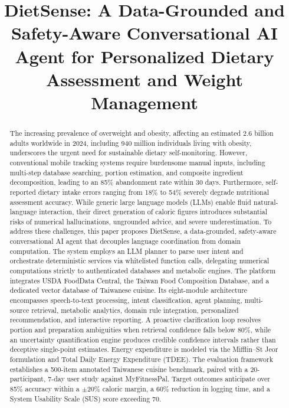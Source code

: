 \documentclass[conference]{IEEEtran}
\begin{document}
\title{DietSense: A Data-Grounded and Safety-Aware Conversational AI Agent for Personalized Dietary Assessment and Weight Management}

\author{
}

\maketitle

\begin{abstract}
The increasing prevalence of overweight and obesity, affecting an estimated 2.6 billion adults worldwide in 2024, including 940 million individuals living with obesity, underscores the urgent need for sustainable dietary self-monitoring. However, conventional mobile tracking systems require burdensome manual inputs, including multi-step database searching, portion estimation, and composite ingredient decomposition, leading to an 85\% abandonment rate within 30 days. Furthermore, self-reported dietary intake errors ranging from 18\% to 54\% severely degrade nutritional assessment accuracy. While generic large language models (LLMs) enable fluid natural-language interaction, their direct generation of caloric figures introduces substantial risks of numerical hallucinations, ungrounded advice, and severe underestimation. To address these challenges, this paper proposes DietSense, a data-grounded, safety-aware conversational AI agent that decouples language coordination from domain computation. The system employs an LLM planner to parse user intent and orchestrate deterministic services via whitelisted function calls, delegating numerical computations strictly to authenticated databases and metabolic engines. The platform integrates USDA FoodData Central, the Taiwan Food Composition Database, and a dedicated vector database of Taiwanese cuisine. Its eight-module architecture encompasses speech-to-text processing, intent classification, agent planning, multi-source retrieval, metabolic analytics, domain rule integration, personalized recommendation, and interactive reporting. A proactive clarification loop resolves portion and preparation ambiguities when retrieval confidence falls below 80\%, while an uncertainty quantification engine produces credible confidence intervals rather than deceptive single-point estimates. Energy expenditure is modeled via the Mifflin--St Jeor formulation and Total Daily Energy Expenditure (TDEE). The evaluation framework establishes a 500-item annotated Taiwanese cuisine benchmark, paired with a 20-participant, 7-day user study against MyFitnessPal. Target outcomes anticipate over 85\% accuracy within a $\pm$20\% caloric margin, a 60\% reduction in logging time, and a System Usability Scale (SUS) score exceeding 70.
\end{abstract}
\end{document}
